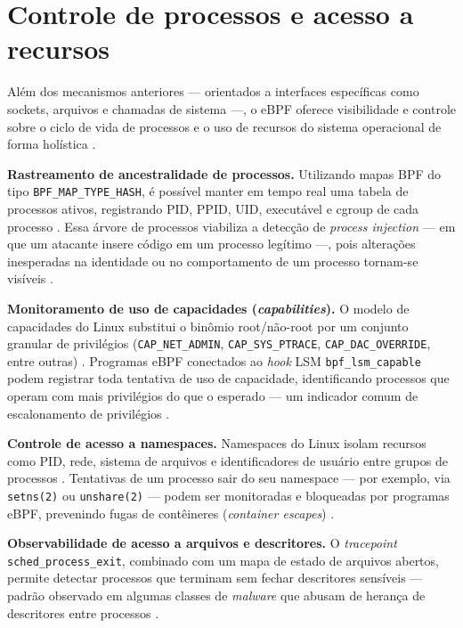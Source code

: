 \section{Controle de processos e acesso a recursos}

Além dos mecanismos anteriores — orientados a interfaces específicas como sockets,
arquivos e chamadas de sistema —, o eBPF oferece visibilidade e controle sobre o
ciclo de vida de processos e o uso de recursos do sistema operacional de forma
holística \cite{gregg2019}.

\textbf{Rastreamento de ancestralidade de processos.}
Utilizando mapas BPF do tipo \texttt{BPF\_MAP\_TYPE\_HASH}, é possível manter em
tempo real uma tabela de processos ativos, registrando PID, PPID, UID, executável
e cgroup de cada processo \cite{linuxkernel2024}.
Essa árvore de processos viabiliza a detecção de \textit{process injection} — em
que um atacante insere código em um processo legítimo —, pois alterações inesperadas
na identidade ou no comportamento de um processo tornam-se visíveis
\cite{majors2022}.

\textbf{Monitoramento de uso de capacidades (\textit{capabilities}).}
O modelo de capacidades do Linux substitui o binômio root/não-root por um conjunto
granular de privilégios (\texttt{CAP\_NET\_ADMIN}, \texttt{CAP\_SYS\_PTRACE},
\texttt{CAP\_DAC\_OVERRIDE}, entre outras) \cite{linuxkernel2024}.
Programas eBPF conectados ao \textit{hook} LSM \texttt{bpf\_lsm\_capable} podem
registrar toda tentativa de uso de capacidade, identificando processos que operam
com mais privilégios do que o esperado — um indicador comum de escalonamento de
privilégios \cite{gregg2020}.

\textbf{Controle de acesso a namespaces.}
Namespaces do Linux isolam recursos como PID, rede, sistema de arquivos e
identificadores de usuário entre grupos de processos \cite{linuxkernel2024}.
Tentativas de um processo sair do seu namespace — por exemplo, via
\texttt{setns(2)} ou \texttt{unshare(2)} — podem ser monitoradas e bloqueadas
por programas eBPF, prevenindo fugas de contêineres (\textit{container escapes})
\cite{cassagnes2020}.

\textbf{Observabilidade de acesso a arquivos e descritores.}
O \textit{tracepoint} \texttt{sched\_process\_exit}, combinado com um mapa de
estado de arquivos abertos, permite detectar processos que terminam sem fechar
descritores sensíveis — padrão observado em algumas classes de \textit{malware}
que abusam de herança de descritores entre processos \cite{gregg2019}.

